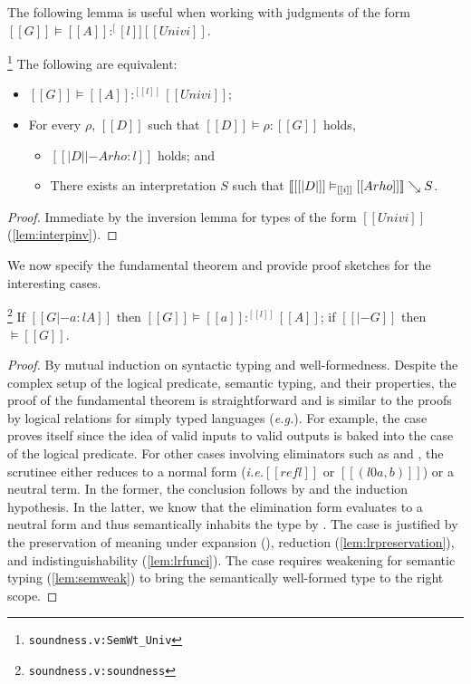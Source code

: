 \documentclass[acmsmall, screen=true, nonacm=true,
  review=\ifpublic false\else true\fi,
  anonymous=\ifanonymous true\else false\fi
]{acmart}
\makeatletter
\DeclarePairedDelimiter{\bracks}{\llbracket}{\rrbracket}
\newcommand{\ie}{\textit{i.e.}\@\xspace}
\newcommand{\eg}{\textit{e.g.}\@\xspace}
\newcommand{\suppl}[3]{{\scriptsize\texttt{#2:#3}}}
\newcommand{\interp}[4]{\bracks{#1 \vDash_{#2} #3} \searrow #4}
\newcommand{\sws}[3]{#1 \vDash #2 : #3}
\newcommand{\swt}[4]{#1 \vDash #2 :^{#3} #4}
\newcommand{\swf}[1]{\vDash #1}
\newlength{\punctwidth}
\newcommand{\stack}[1]{%
  \settowidth{\punctwidth}{#1}%
  \hspace*{-\the\punctwidth}%
}
\makeatother
\begin{document}
\ifextended
The following lemma is useful when working with judgments of the form
$\swt{[[G]]}{[[A]]}[[l]][[Univ i]]$.
\begin{lemma}
  \stack{.~}\footnote{\suppl{theories}{soundness.v}{SemWt\_Univ}}
  The following are equivalent:
  \begin{itemize}
    \item $\swt{[[G]]}{[[A]]}{[[l]]}{[[Univ i]]}$;
    \item For every $\rho$, $[[D]]$ such that $\sws{[[D]]}{\rho}{[[G]]}$ holds,
      \begin{itemize}
        \item $[[| D | |- A { rho } : l]]$ holds; and
        \item There exists an interpretation $S$ such that $\interp{[[|D|]]}{[[i]]}{[[A { rho }]]}{S}$.
      \end{itemize}
  \end{itemize}
\end{lemma}
\begin{proof}
  Immediate by the inversion lemma for types of the form $[[Univ i]]$ (\cref{lem:interpinv}).
\end{proof}
\fi

We now specify the fundamental theorem and provide proof
sketches for the interesting cases.

\begin{theorem}
  \stack{.~}\footnote{\suppl{theories}{soundness.v}{soundness}}
  \label{thm:fundamental}
  If $[[G |- a : l A]]$ then $\swt{[[G]]}{[[a]]}{[[l]]}{[[A]]}$;
  if $[[|- G]]$ then $\swf{[[G]]}$.
\end{theorem}
\begin{proof}
By mutual induction on syntactic typing and
well-formedness. Despite the complex setup of the logical predicate,
semantic typing, and their properties, the proof of the fundamental
theorem is straightforward and is similar to the proofs by logical
relations for simply typed languages (\eg \citet{abel:poplmark}).
For example, the  case proves itself since
the idea of valid inputs to valid outputs is baked into the
 case of the logical predicate.
For other cases involving eliminators such as  and , the
scrutinee either reduces to a normal form (\ie $[[refl]]$ or $[[(l0 a, b)]]$) or a neutral
term. In the former, the conclusion follows by
 and the induction
hypothesis. In the latter, we know that the elimination form
evaluates to a neutral form and thus semantically inhabits the type by
.
The  case is justified by
the preservation of meaning under expansion (),
reduction (\cref{lem:lrpreservation}), and indistinguishability
(\cref{lem:lrfunci}).
The  case requires weakening for semantic typing
(\cref{lem:semweak}) to bring the semantically well-formed type to the
right scope.
\end{proof}
\end{document}
